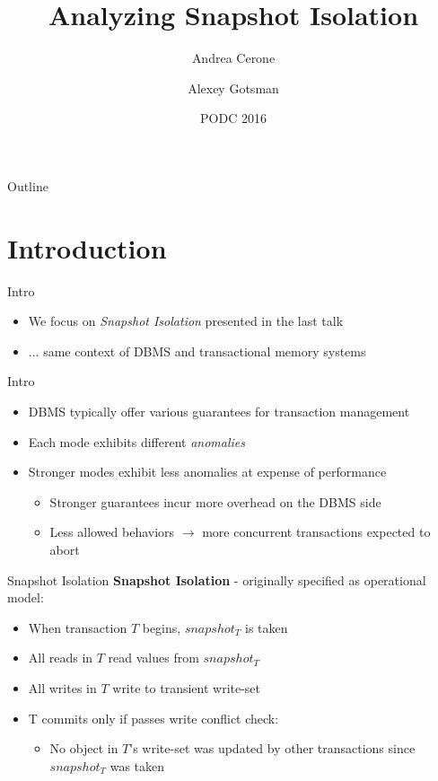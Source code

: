 \documentclass{beamer}
\title[Analyzing Snapshot Isolation] %
{Analyzing Snapshot Isolation}
\author[Andrea Cerone, Alexey Gotsman] %
{Andrea Cerone \and Alexey Gotsman}
\institute[IMDEA Software Institute] %
{IMDEA Software Institute}
\date[CFP 2003] %
{PODC 2016}
\begin{document}
\begin{frame}
	\titlepage
\end{frame}

\begin{frame}{Outline}
	\tableofcontents
\end{frame}

\section{Introduction}

\begin{frame}{Intro}
	\begin{itemize}
		\item We focus on \emph{Snapshot Isolation} presented in the last talk
		\item ... same context of DBMS and transactional memory systems
	\end{itemize}
\end{frame}

\begin{frame}{Intro}
	\begin{itemize}
		\item DBMS typically offer various guarantees for transaction management
		\item Each mode exhibits different \emph{anomalies}
		\item Stronger modes exhibit less anomalies at expense of performance
		\begin{itemize}
			\item Stronger guarantees incur more overhead on the DBMS side
			\item Less allowed behaviors $ \rightarrow $ more concurrent transactions expected to abort
		\end{itemize}
	\end{itemize}
\end{frame}

\begin{frame}{Snapshot Isolation}
	\textbf{Snapshot Isolation} - originally specified as operational model:
	\begin{itemize}
		\item When transaction $ T $ begins, $ snapshot_T $ is taken
		\item All reads in $ T $ read values from $ snapshot_T $
		\item All writes in $ T $ write to transient write-set
		\item T commits only if passes write conflict check:
		\begin{itemize}
			\item No object in $T$'s write-set was updated by other transactions since $snapshot_T$ was taken
		\end{itemize}
	\end{itemize}	
\end{frame}
\end{document}
